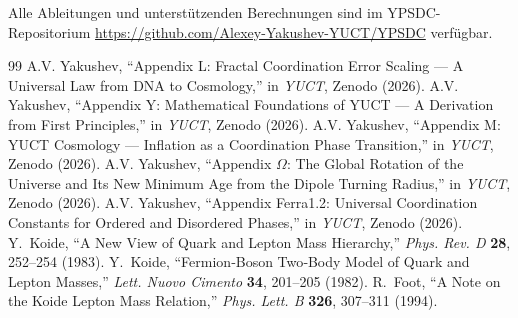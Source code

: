\documentclass[11pt,a4paper]{article}
\theoremstyle{remark}
\begin{document}
	Alle Ableitungen und unterstützenden Berechnungen sind im YPSDC-Repositorium \url{https://github.com/Alexey-Yakushev-YUCT/YPSDC} verfügbar.
	
	\begin{thebibliography}{99}
		 A.V. Yakushev, ``Appendix L: Fractal Coordination Error Scaling — A Universal Law from DNA to Cosmology,'' in \emph{YUCT}, Zenodo (2026).
		 A.V. Yakushev, ``Appendix Y: Mathematical Foundations of YUCT — A Derivation from First Principles,'' in \emph{YUCT}, Zenodo (2026).
		 A.V. Yakushev, ``Appendix M: YUCT Cosmology — Inflation as a Coordination Phase Transition,'' in \emph{YUCT}, Zenodo (2026).
		 A.V. Yakushev, ``Appendix $\Omega$: The Global Rotation of the Universe and Its New Minimum Age from the Dipole Turning Radius,'' in \emph{YUCT}, Zenodo (2026).
		 A.V. Yakushev, ``Appendix Ferra1.2: Universal Coordination Constants for Ordered and Disordered Phases,'' in \emph{YUCT}, Zenodo (2026).
		 Y.~Koide, ``A New View of Quark and Lepton Mass Hierarchy,''
		\emph{Phys. Rev. D} \textbf{28}, 252--254 (1983).
		 Y.~Koide, ``Fermion‑Boson Two‑Body Model of Quark and Lepton Masses,''
		\emph{Lett. Nuovo Cimento} \textbf{34}, 201--205 (1982).
		 R.~Foot, ``A Note on the Koide Lepton Mass Relation,''
		\emph{Phys. Lett. B} \textbf{326}, 307--311 (1994).
	\end{thebibliography}
	
\end{document}
